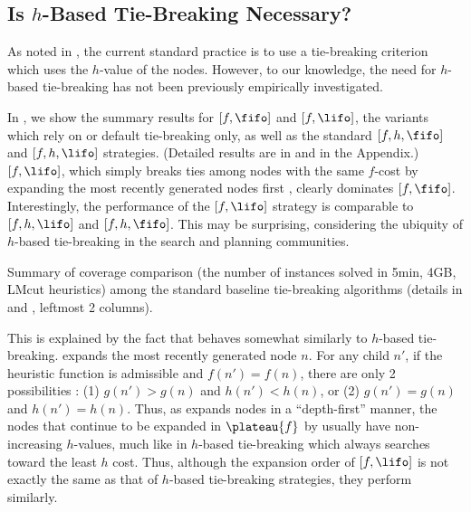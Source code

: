 \subsection{Is $h$-Based Tie-Breaking Necessary?}

\label{sec:noh}
As noted in , the current standard practice is to use a tie-breaking criterion which uses the $h$-value of the nodes. However, to our knowledge, the need for $h$-based tie-breaking has not been previously empirically investigated.

In , we show the summary results for $[f, \fifo]$ and $[f, \lifo]$, the
\astar variants which rely on \fifo or \lifo default tie-breaking only, as well as the standard $[f, h, \fifo]$ and $[f, h, \lifo]$ strategies.
(Detailed results are in
 and  in the Appendix.)
$[f,\lifo]$, which simply breaks ties among nodes with the same
$f$-cost by expanding the most recently generated nodes first
\cite{korf1985depth}, clearly dominates $[f,\fifo]$.  Interestingly,
the performance of the $[f,\lifo]$ strategy is comparable to
$[f,h,\lifo]$ and $[f,h,\fifo]$.  This may be surprising, considering
the ubiquity of $h$-based tie-breaking in the search and planning
communities.

\begin{table}[tbp]
 {
 \centering
 
 \caption{
 Summary of coverage comparison (the number of instances solved in 5min, 4GB, LMcut
 heuristics) among
 the standard baseline tie-breaking algorithms (details in  and , leftmost 2 columns). 
 }
 \label{tbl:summary-std}
 }
\end{table}


This is explained by the fact that 
\lifo behaves somewhat similarly to $h$-based tie-breaking.
\lifo expands the most recently generated node $n$.
For any child $n'$, 
if the heuristic function is admissible and $f(n') = f(n)$, there are only 2 possibilities :
(1) $g(n') > g(n)$ and $h(n') < h(n)$, or
(2) $g(n') = g(n)$ and $h(n') = h(n)$.
Thus, as \lifo expands nodes in a ``depth-first'' manner,
the nodes that continue to be expanded in $\plateau{f}$ by \lifo usually   %
have non-increasing $h$-values,
much like in $h$-based tie-breaking which always searches toward the least $h$ cost.
Thus, although the expansion order of $[f,\lifo]$ is not exactly the same as that of $h$-based tie-breaking strategies,
they perform similarly.

